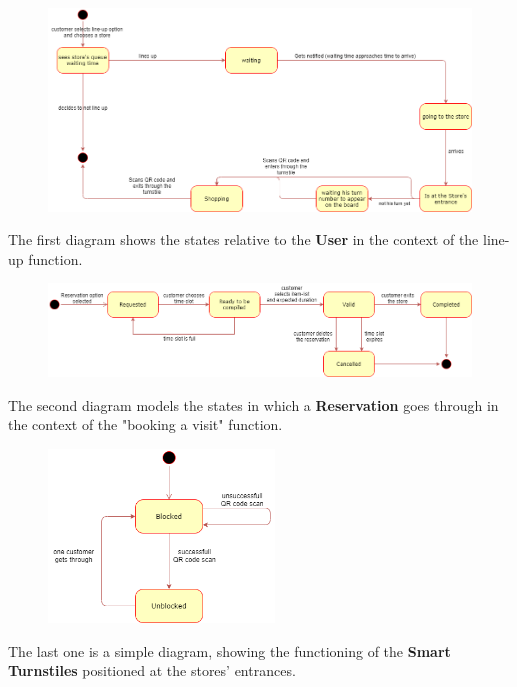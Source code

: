 \documentclass{article}
\begin{document}
\begin{figure}[H]


  \includegraphics[width=\linewidth]{Customer_state.png}

\end{figure}

The first diagram shows the states relative to the \textbf{User} in the context of the line-up function.
\begin{figure}[H]



  \includegraphics[width=\linewidth]{Reservation_state.png}


\end{figure}

The second diagram models the states in which a \textbf{Reservation} goes through in the context of the "booking a visit" function.\newline\newline\newline

\begin{figure}[H]

  \includegraphics[width=6cm]{Turnstiles_state.png}


\end{figure}
The last one is a simple diagram, showing the functioning of the \textbf{Smart Turnstiles} positioned at the stores' entrances.
\end{document}
